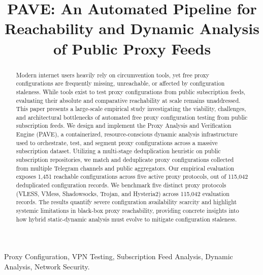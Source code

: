 \documentclass[10pt,conference]{IEEEtran}
\begin{document}
\title{PAVE: An Automated Pipeline for Reachability and Dynamic Analysis of Public Proxy Feeds}

\author{
}

\maketitle

\begin{abstract}
Modern internet users heavily rely on circumvention tools, yet free proxy configurations are frequently missing, unreachable, or affected by configuration staleness.
While tools exist to test proxy configurations from public subscription feeds, evaluating their absolute and comparative reachability at scale remains unaddressed.
This paper presents a large-scale empirical study investigating the viability, challenges, and architectural bottlenecks of automated free proxy configuration testing from public subscription feeds.
We design and implement the Proxy Analysis and Verification Engine (PAVE), a containerized, resource-conscious dynamic analysis infrastructure used to orchestrate, test, and segment proxy configurations across a massive subscription dataset.
Utilizing a multi-stage deduplication heuristic on public subscription repositories, we match and deduplicate proxy configurations collected from multiple Telegram channels and public aggregators.
Our empirical evaluation exposes 1,451 reachable configurations across five active proxy protocols, out of 115,042 deduplicated configuration records.
We benchmark five distinct proxy protocols (VLESS, VMess, Shadowsocks, Trojan, and Hysteria2) across 115,042 evaluation records.
The results quantify severe configuration availability scarcity and highlight systemic limitations in black-box proxy reachability, providing concrete insights into how hybrid static-dynamic analysis must evolve to mitigate configuration staleness.
\end{abstract}

\begin{IEEEkeywords}
Proxy Configuration, VPN Testing, Subscription Feed Analysis, Dynamic Analysis, Network Security.
\end{IEEEkeywords}
\end{document}
